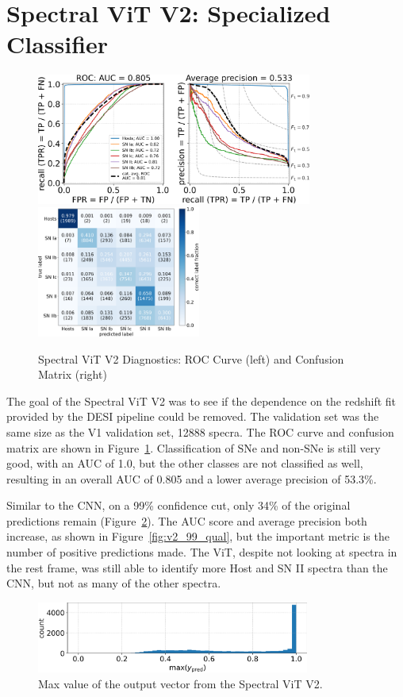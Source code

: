 \section{Spectral ViT V2: Specialized Classifier}
\begin{figure}[b!]
    \centering
    \includegraphics[height=4.3cm]{figures/v2_real/vit_model_V2rocfulle_e26.png}
    \quad
    \includegraphics[height=4.3cm]{figures/v2_real/vit_model_V2cmfull_e26.png}
    \caption[Spectral ViT V2 Diagnostics]{Spectral ViT V2 Diagnostics: ROC Curve (left) and Confusion Matrix (right)\label{fig:v2_qual}}
\end{figure}
The goal of the Spectral ViT V2 was to see if the dependence on the redshift fit 
provided by the DESI pipeline could be removed. The validation set was the same size 
as the V1 validation set, 12888 specra. The ROC curve and confusion matrix are shown
in Figure~\ref{fig:v2_qual}. Classification of SNe and non-SNe is still very good,
with an AUC of 1.0, but the other classes are not classified as well, resulting in 
an overall AUC of 0.805 and a lower average precision of 53.3\%. 


Similar to the CNN, on a 99\% confidence cut, only 34\% of the original predictions
remain (Figure~\ref{fig:v2_max}). The AUC score and average precision both increase, as shown in Figure~\ref{fig:v2_99_qual}, 
but the important metric is the number of positive predictions made. The ViT, 
despite not looking at spectra in the rest frame, was still able to identify more 
Host and SN II spectra than the CNN, but not as many of the other spectra. 


\begin{figure}[t!]
    \centering
    \includegraphics[width=0.8\textwidth]{figures/v2_real/vit_model_V2max_ypred_26.png}
    \caption[Spectral ViT V2 Confidence]{Max value of the output vector from the Spectral ViT V2.\label{fig:v2_max}}
\end{figure}

